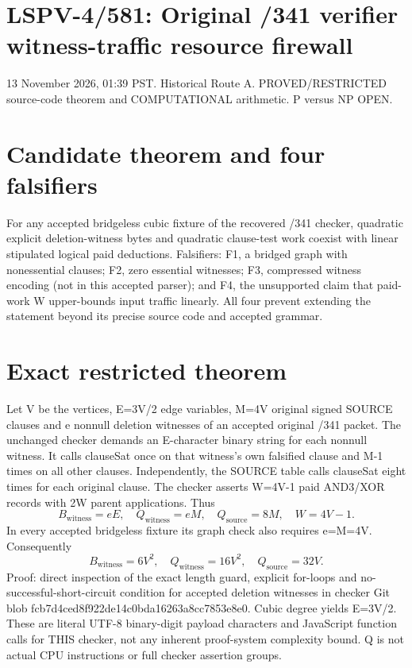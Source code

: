 \documentclass[11pt]{article}
\begin{document}
\section*{LSPV-4/581: Original /341 verifier witness-traffic resource firewall}
13 November 2026, 01:39 PST. Historical Route A. PROVED/RESTRICTED source-code theorem and COMPUTATIONAL arithmetic. P versus NP OPEN.

\section*{Candidate theorem and four falsifiers}
For any accepted bridgeless cubic fixture of the recovered /341 checker, quadratic explicit deletion-witness bytes and quadratic clause-test work coexist with linear stipulated logical paid deductions. Falsifiers: F1, a bridged graph with nonessential clauses; F2, zero essential witnesses; F3, compressed witness encoding (not in this accepted parser); and F4, the unsupported claim that paid-work W upper-bounds input traffic linearly. All four prevent extending the statement beyond its precise source code and accepted grammar.

\section*{Exact restricted theorem}
Let V be the vertices, E=3V/2 edge variables, M=4V original signed SOURCE clauses and e nonnull deletion witnesses of an accepted original /341 packet. The unchanged checker demands an E-character binary string for each nonnull witness. It calls clauseSat once on that witness's own falsified clause and M-1 times on all other clauses. Independently, the SOURCE table calls clauseSat eight times for each original clause. The checker asserts W=4V-1 paid AND3/XOR records with 2W parent applications. Thus
\[
\boxed{B_{\mathrm{witness}}=eE,\quad Q_{\mathrm{witness}}=eM,\quad Q_{\mathrm{source}}=8M,\quad W=4V-1.}
\]
In every accepted bridgeless fixture its graph check also requires e=M=4V. Consequently
\[
\boxed{B_{\mathrm{witness}}=6V^2,\quad Q_{\mathrm{witness}}=16V^2,\quad Q_{\mathrm{source}}=32V.}
\]
Proof: direct inspection of the exact length guard, explicit for-loops and no-successful-short-circuit condition for accepted deletion witnesses in checker Git blob fcb7d4ced8f922de14c0bda16263a8cc7853e8e0. Cubic degree yields E=3V/2. These are literal UTF-8 binary-digit payload characters and JavaScript function calls for THIS checker, not any inherent proof-system complexity bound. Q is not actual CPU instructions or full checker assertion groups.
\end{document}
